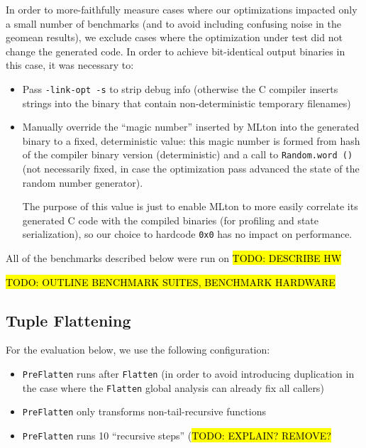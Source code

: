 \documentclass[leqno,11pt]{article}
\begin{document}
In order to more-faithfully measure cases where our optimizations impacted only
a small number of benchmarks (and to avoid including confusing noise in the
geomean results), we exclude cases where the optimization under test did not
change the generated code. In order to achieve bit-identical output binaries in
this case, it was necessary to:
\begin{itemize}

\item Pass \texttt{-link-opt -s} to strip debug info (otherwise the C compiler
  inserts strings into the binary that contain non-deterministic temporary
  filenames)

\item Manually override the ``magic number'' inserted by MLton into the
  generated binary to a fixed, deterministic value: this magic number is formed
  from hash of the compiler binary version (deterministic) and a call to
  \texttt{Random.word ()} (not necessarily fixed, in case the optimization pass
  advanced the state of the random number generator).

The purpose of this value is just to enable MLton to more easily correlate its
generated C code with the compiled binaries (for profiling and state
serialization), so our choice to hardcode \texttt{0x0} has no impact on
performance.

\end{itemize}

All of the benchmarks described below were run on \hl{TODO: DESCRIBE HW}

\hl{TODO: OUTLINE BENCHMARK SUITES, BENCHMARK HARDWARE}

\FloatBarrier
\subsection{Tuple Flattening}
For the evaluation below, we use the following configuration:
\begin{itemize}

\item \texttt{PreFlatten} runs after \texttt{Flatten} (in order to avoid
  introducing duplication in the case where the \texttt{Flatten} global analysis
  can already fix all callers)

\item \texttt{PreFlatten} only transforms non-tail-recursive functions

\item \texttt{PreFlatten} runs 10 ``recursive steps'' (\hl{TODO: EXPLAIN? REMOVE?}

\end{itemize}
\end{document}
